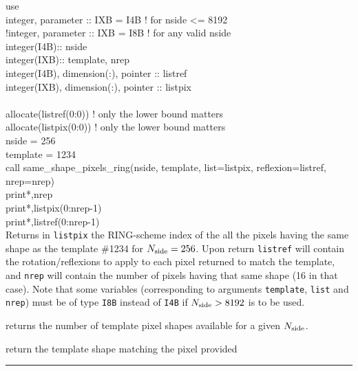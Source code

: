 \begin{example}
{
use  \\
integer, parameter :: IXB = I4B  ! for nside <= 8192\\
!integer, parameter :: IXB = I8B  ! for any valid nside\\
integer(I4B):: nside\\
integer(IXB):: template, nrep\\
integer(I4B), dimension(:), pointer :: listref\\
integer(IXB), dimension(:), pointer :: listpix\\
\\
allocate(listref(0:0)) ! only the lower bound matters\\
allocate(listpix(0:0)) ! only the lower bound matters\\
nside = 256\\
template = 1234\\
call same\_shape\_pixels\_ring(nside, template, list=listpix, reflexion=listref, nrep=nrep) \\
print*,nrep\\
print*,listpix(0:nrep-1)\\
print*,listref(0:nrep-1)\\
}
{
Returns in {\tt listpix} the RING-scheme index of the all the pixels having
the same shape as the template \#1234 for $N_{\mathrm{side}}=256$. Upon return {\tt listref} will
contain the rotation/reflexions to apply to each pixel returned to match the template,
and {\tt nrep} will contain the number of pixels having that same shape (16 in that case).
Note that some variables (corresponding to arguments \texttt{template}, \texttt{list} and \texttt{nrep})
must be of type \texttt{I8B} instead of \texttt{I4B} if $N_{\mathrm{side}}>8192$ is to be used.
}
\end{example}
\begin{related}
  \begin{sulist}{} %
  \item[\htmlref{nside2templates}{sub:nside2ntemplates}] returns the
  number of template pixel shapes available for a given $N_{\mathrm{side}}$.
  \item[\htmlref{template\_pixel\_ring}{sub:template_pixel_xxx}] 
  \item[\htmlref{template\_pixel\_nest}{sub:template_pixel_xxx}] 
  return
  the template shape matching the pixel provided
  \end{sulist}
\end{related}

\rule{\hsize}{2mm}


